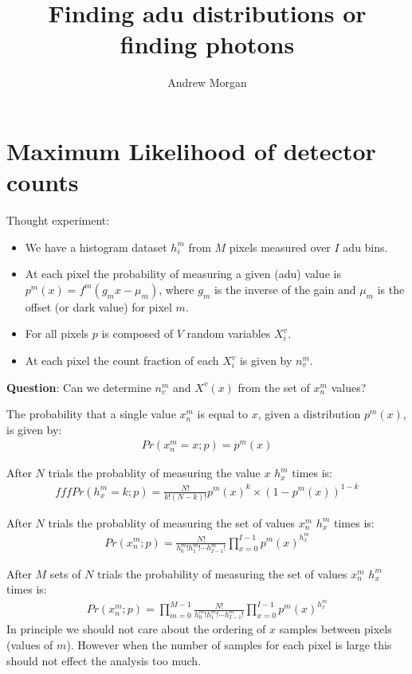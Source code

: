 \documentclass[11pt]{article}
\title{\textbf{Finding adu distributions or finding photons}}
\author{Andrew Morgan}
\date{}
\begin{document}
\maketitle

\section{Maximum Likelihood of detector counts}
Thought experiment:

\begin{itemize}

  \item We have a histogram dataset $h^m_i$ from $M$ pixels measured over $I$ adu bins.
  \item At each pixel the probability of measuring a given (adu) value is $p^m(x) = f^m(g_m x - \mu_m)$, where $g_m$ is the inverse of the gain and $\mu_m$ is the offset (or dark value) for pixel $m$. 
  \item For all pixels $p$ is composed of $V$ random variables $X^v_i$.
  \item At each pixel the count fraction of each $X^v_i$ is given by $n^m_v$.
\end{itemize}

\textbf{Question}: Can we determine $n^m_v$ and $X^v(x)$ from the set of $x^m_n$ values?

The probability that a single value $x^m_n$ is equal to $x$, given a distribution $p^m(x)$, is given by:
\begin{align}
   Pr(x^m_n = x; p) = p^m(x)
\end{align}

After $N$ trials the probablity of measuring the value $x$ $h^m_x$ times is:
\begin{align}fff
   Pr(h^m_x = k; p) = \frac{N!}{k!(N-k)!} p^m(x)^k \times (1-p^m(x))^{1-k}
\end{align}

After $N$ trials the probablity of measuring the set of values $x^m_n$ $h^m_x$ times is:
\begin{align}
   Pr(x^m_n; p) = \frac{N!}{h^m_0! h^m_1! \cdots h^m_{I-1}!} \prod_{x=0}^{I-1} p^m(x)^{h^m_{x}}
\end{align}


After $M$ sets of $N$ trials the probability of measuring the set of values $x^m_n$ $h^m_x$ times is:
\begin{align}
   Pr(x^m_n; p) = \prod_{m=0}^{M-1}\frac{N!}{h^m_0! h^m_1! \cdots h^m_{I-1}!} \prod_{x=0}^{I-1} p^m(x)^{h^m_{x}}
\end{align}
In principle we should not care about the ordering of $x$ samples between pixels (values of $m$). However when the number of samples for each pixel is large this should not effect the analysis too much. 
\end{document}

